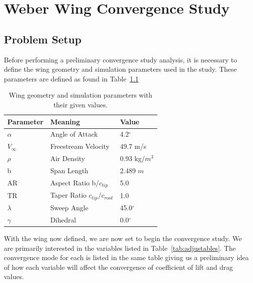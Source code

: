 \documentclass{report}
\begin{document}
\chapter{Weber Wing Convergence Study}
\section{Problem Setup}

Before performing a preliminary convergence study analysis, it is necessary to define the wing geometry and simulation parameters used in the study.
These parameters are defined as found in Table~\ref{tab:geometry}

\begin{table}[H]
    \centering
    \caption{Wing geometry and simulation parameters with their given values.}\label{tab:geometry}
    \begin{tabular}{l l l}
        \toprule
        \textbf{Parameter} & \textbf{Meaning} & \textbf{Value} \\
        \midrule
        $\alpha$ & Angle of Attack & 4.2$^\circ$ \\
        $V_{\infty}$ & Freestream Velocity & 49.7 m/s \\
        $\rho$ & Air Density & 0.93 kg/$m^3$ \\
        b & Span Length & 2.489 $m$ \\
        AR & Aspect Ratio b/${c_{tip}}$ & 5.0 \\
        TR & Taper Ratio ${c_{tip}}/{c_{root}}$ & 1.0 \\
        $\lambda$ & Sweep Angle & 45.0$^\circ$ \\
        $\gamma$ & Dihedral & 0.0$^\circ$ \\

    \end{tabular}
\end{table}

With the wing now defined, we are now set to begin the convergence study. We are primarily interested in the variables listed in Table~\ref{tab:adjustables}.
The convergence mode for each is listed in the same table giving us a preliminary idea of how each variable will affect the convergence of coefficient of lift and drag values.
\end{document}
